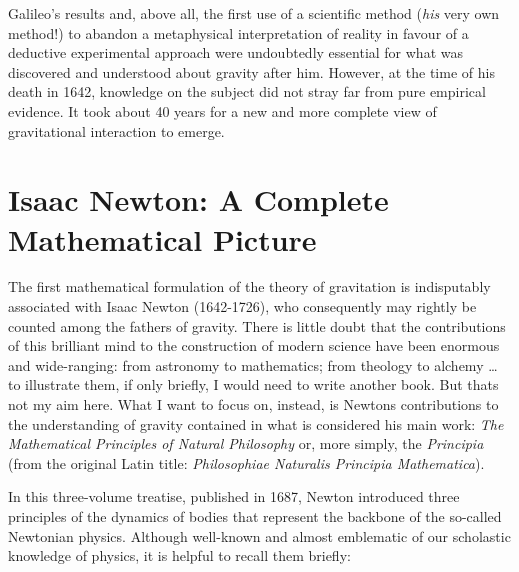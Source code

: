 Galileo's results and, above all, the first use of a scientific
method (\emph{his} very own method!) to abandon a metaphysical
interpretation of reality in favour of a deductive experimental approach were
undoubtedly essential for what was discovered and understood about gravity after him.
However, at the time of his death in 1642, knowledge on the subject did not stray far
from pure empirical evidence. It took about 40 years for a new and more complete view of
gravitational interaction to emerge.

\section{Isaac Newton: A Complete Mathematical Picture}\label{sec:02-newton}

The first mathematical formulation of the theory of gravitation is indisputably
associated with Isaac Newton (1642-1726), who consequently may rightly be counted among
the fathers of gravity. There is little doubt that the contributions of this brilliant
mind to the construction of modern science have been enormous and wide-ranging: from
astronomy to mathematics; from theology to alchemy \ldots{} to illustrate them, if only
briefly, I would need to write another book. But that\textquotesingle s not my aim here.
What I want to focus on, instead, is Newton\textquotesingle s contributions to the
understanding of gravity contained in what is considered his main work: \emph{The
Mathematical Principles of Natural Philosophy} or, more simply, the
\emph{Principia} (from the original Latin title:
\emph{Philosophiae Naturalis Principia Mathematica}).

In this three-volume treatise, published in 1687, Newton introduced three principles of
the dynamics of bodies that represent the backbone of the so-called Newtonian physics.
Although well-known and almost emblematic of our scholastic knowledge of physics, it is
helpful to recall them briefly:

